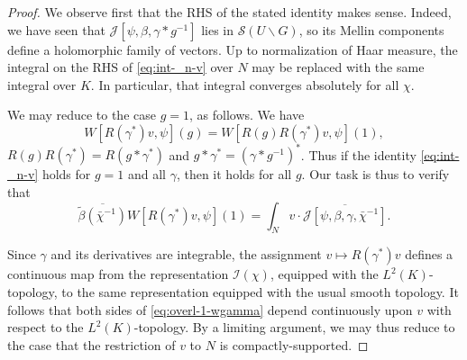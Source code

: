 \begin{proof}
  We observe first that the RHS of the stated identity makes sense.  Indeed, we have seen that $\mathcal{J}[\psi,\beta,\gamma \ast g^{-1}]$ lies in $\mathcal{S}(U \backslash G)$, so its Mellin components define a holomorphic family of vectors.  Up to normalization of Haar measure, the integral on the RHS of \eqref{eq:int-_n-v} over $N$ may be replaced with the same integral over $K$.  In particular, that integral converges absolutely for all $\chi$.

  We may reduce to the case $g = 1$, as follows.  We have
  \begin{equation*}
    W[ R(\gamma^* ) v, \psi](g) = W[R(g) R(\gamma^* ) v, \psi](1),
  \end{equation*}
  $R(g ) R(\gamma^*) = R(g \ast \gamma^*)$ and $g \ast \gamma^* = (\gamma \ast g^{-1})^*$.  Thus if the identity \eqref{eq:int-_n-v} holds for $g=1$ and all $\gamma$, then it holds for all $g$.  Our task is thus to verify that
  \begin{equation}\label{eq:overl-1-wgamma}
    \overline{\tilde{\beta}(\bar{\chi}^{-1})}
    W[R(\gamma^*) v,\psi](1)
    =
    \int_{N} v \cdot \overline{\mathcal{J}[\psi, \beta, \gamma, \bar{\chi}^{-1}]}.
  \end{equation}

  Since $\gamma$ and its derivatives are integrable, the assignment $v \mapsto R(\gamma^*) v$ defines a continuous map from the representation $\mathcal{I}(\chi)$, equipped with the $L^2(K)$-topology, to the same representation equipped with the usual smooth topology.  It follows that both sides of \eqref{eq:overl-1-wgamma}  depend continuously upon $v$ with respect to the $L^2(K)$-topology.  By a limiting argument, we may thus reduce to the case that the restriction of $v$ to $N$ is compactly-supported.


\end{proof}
